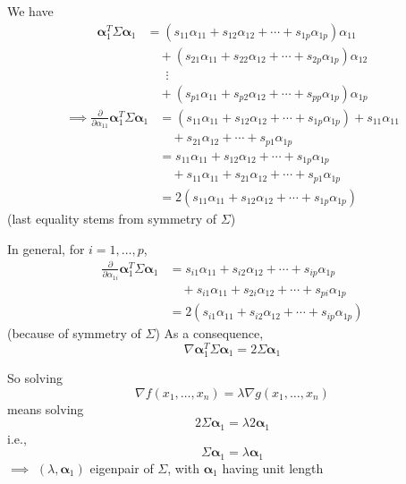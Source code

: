 \documentclass[aspectratio=169]{beamer}\usepackage[]{graphicx}\usepackage[]{xcolor}
\begin{document}
\begin{frame}
We have
\begin{align*}
\bm{\alpha}_1^T\Sigma\bm{\alpha}_1 &=
(s_{11}\alpha_{11}+s_{12}\alpha_{12}+\cdots+s_{1p}\alpha_{1p})\alpha_{11} \\
&\quad +
(s_{21}\alpha_{11}+s_{22}\alpha_{12}+\cdots+s_{2p}\alpha_{1p})\alpha_{12} \\
&\quad\;\;\vdots \\
&\quad +
(s_{p1}\alpha_{11}+s_{p2}\alpha_{12}+\cdots+s_{pp}\alpha_{1p})\alpha_{1p} 
\end{align*}
\begin{align*}
\implies\frac{\partial}{\partial \alpha_{11}}
\bm{\alpha}_1^T\Sigma\bm{\alpha}_1  
&= 
(s_{11}\alpha_{11}+s_{12}\alpha_{12}+\cdots+s_{1p}\alpha_{1p})+s_{11}\alpha_{11} \\
&\quad + s_{21}\alpha_{12} +\cdots + s_{p1}\alpha_{1p} \\
&= s_{11}\alpha_{11}+s_{12}\alpha_{12}+\cdots+s_{1p}\alpha_{1p} \\
&\quad+
s_{11}\alpha_{11}+s_{21}\alpha_{12}+\cdots+s_{p1}\alpha_{1p} \\
&= 2(s_{11}\alpha_{11}+s_{12}\alpha_{12}+\cdots+s_{1p}\alpha_{1p})
\end{align*}
(last equality stems from symmetry of $\Sigma$)
\end{frame}

\begin{frame}
In general, for $i=1,\ldots,p$,
\begin{align*}
\frac{\partial}{\partial \alpha_{1i}}
\bm{\alpha}_1^T\Sigma\bm{\alpha}_1  
&= s_{i1}\alpha_{11}+s_{i2}\alpha_{12}+\cdots+s_{ip}\alpha_{1p}\\
&\quad+s_{i1}\alpha_{11}+s_{2i}\alpha_{12}+\cdots+s_{pi}\alpha_{1p} \\
&= 2(s_{i1}\alpha_{11}+s_{i2}\alpha_{12}+\cdots+s_{ip}\alpha_{1p})
\end{align*}
(because of symmetry of $\Sigma$)
\vfill
As a consequence,
\[
\nabla \bm{\alpha}_1^T\Sigma\bm{\alpha}_1
=2\Sigma\bm{\alpha}_1
\]
\end{frame}

\begin{frame}
So solving
\[
\nabla f(x_1,\ldots,x_n) = \lambda\nabla g(x_1,\ldots,x_n) 
\]
means solving
\[
2\Sigma\bm{\alpha}_1 = \lambda 2\bm{\alpha}_1 
\]
i.e.,
\[
\Sigma\bm{\alpha}_1 = \lambda\bm{\alpha}_1 
\]
\vfill
$\implies$
$(\lambda,\bm{\alpha}_1)$ eigenpair of $\Sigma$, with $\bm{\alpha}_1$ having unit length
\end{frame}
\end{document}
